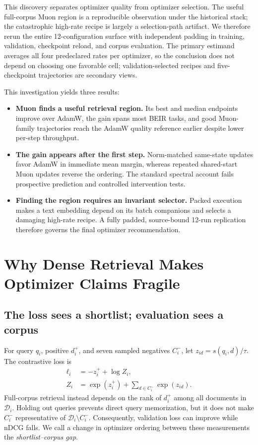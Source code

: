 \documentclass[11pt]{article}
\begin{document}
This discovery separates optimizer quality from optimizer selection. The useful full-corpus Muon
region is a reproducible observation under the historical stack; the catastrophic high-rate recipe
is largely a selection-path artifact. We therefore rerun the entire 12-configuration surface with
independent padding in training, validation, checkpoint reload, and corpus evaluation. The primary
estimand averages all four predeclared rates per optimizer, so the conclusion does not depend on
choosing one favorable cell; validation-selected recipes and five-checkpoint trajectories are
secondary views.

This investigation yields three results:
\begin{itemize}
    \item \textbf{Muon finds a useful retrieval region.} Its best and median endpoints improve over
    AdamW, the gain spans most BEIR tasks, and good Muon-family trajectories reach the AdamW quality
    reference earlier despite lower per-step throughput.
    \item \textbf{The gain appears after the first step.} Norm-matched same-state updates favor
    AdamW in immediate mean margin, whereas repeated shared-start Muon updates reverse the ordering.
    The standard spectral account fails prospective prediction and controlled intervention tests.
    \item \textbf{Finding the region requires an invariant selector.} Packed execution makes a text
    embedding depend on its batch companions and selects a damaging high-rate recipe. A fully padded,
    source-bound 12-run replication therefore governs the final optimizer recommendation.
\end{itemize}

\section{Why Dense Retrieval Makes Optimizer Claims Fragile}

\subsection{The loss sees a shortlist; evaluation sees a corpus}

For query $q_i$, positive $d_i^+$, and seven sampled negatives $C_i^-$, let
$z_{id}=s(q_i,d)/\tau$. The contrastive loss is
\begin{align}
\ell_i &= -z_i^+ + \log Z_i, \\
Z_i &= \exp(z_i^+) + \sum_{d\in C_i^-}\exp(z_{id}).
\end{align}
Full-corpus retrieval instead depends on the rank of $d_i^+$ among all documents in
$\mathcal D_i$. Holding out queries prevents direct query memorization, but it does not make
$C_i^-$ representative of $\mathcal D_i\setminus C_i^-$. Consequently, validation loss can improve
while nDCG falls. We call a change in optimizer ordering between these measurements the
\emph{shortlist--corpus gap}.
\end{document}
